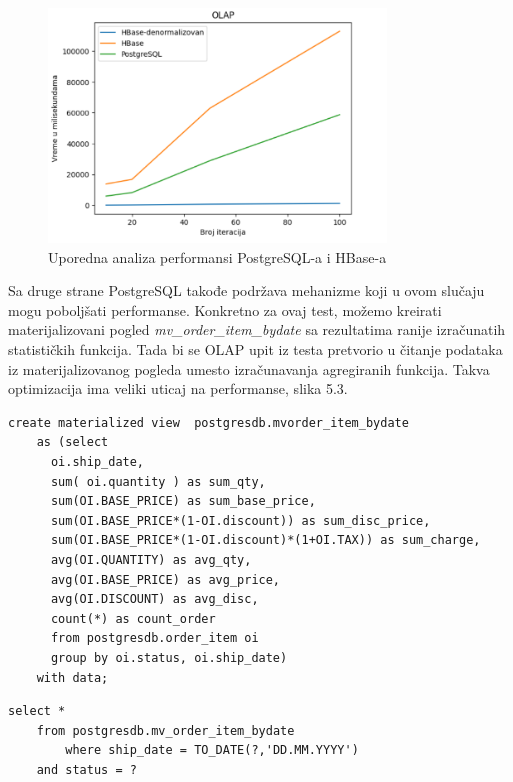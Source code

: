 \documentclass[12pt,oneside]{memoir}
\begin{document}
\begin{figure}[!ht]
  \centering
  \includegraphics[width=0.8\textwidth]{olap-vizualization.png}
  \caption{Uporedna analiza performansi PostgreSQL-a i HBase-a}
  \label{fig:grafikon}
\end{figure}

Sa druge strane PostgreSQL takođe podržava mehanizme koji u ovom slučaju mogu poboljšati performanse. Konkretno za ovaj test, možemo kreirati materijalizovani pogled \textit{mv\_order\_item\_bydate} sa rezultatima ranije izračunatih statističkih funkcija. Tada bi se OLAP upit iz testa pretvorio u čitanje podataka iz materijalizovanog pogleda umesto izračunavanja agregiranih funkcija. Takva optimizacija ima veliki uticaj na performanse, slika 5.3.

\pagebreak 

\begin{lstlisting}[title={mvorder\_item\_bydate - Kreiranje materijalizovanog pogleda},captionpos=b]
create materialized view  postgresdb.mvorder_item_bydate
    as (select
	  oi.ship_date,
	  sum( oi.quantity ) as sum_qty,
	  sum(OI.BASE_PRICE) as sum_base_price,
	  sum(OI.BASE_PRICE*(1-OI.discount)) as sum_disc_price,
	  sum(OI.BASE_PRICE*(1-OI.discount)*(1+OI.TAX)) as sum_charge,
	  avg(OI.QUANTITY) as avg_qty,
	  avg(OI.BASE_PRICE) as avg_price,
	  avg(OI.DISCOUNT) as avg_disc,
	  count(*) as count_order
	  from postgresdb.order_item oi
	  group by oi.status, oi.ship_date)
	with data;
 \end{lstlisting}

\begin{lstlisting}[title={executeOLAPQuery - OLAP upit koristeći materijalizovani pogled},captionpos=b]
select *
	from postgresdb.mv_order_item_bydate
        where ship_date = TO_DATE(?,'DD.MM.YYYY')
	and status = ?
 \end{lstlisting}
\end{document}
